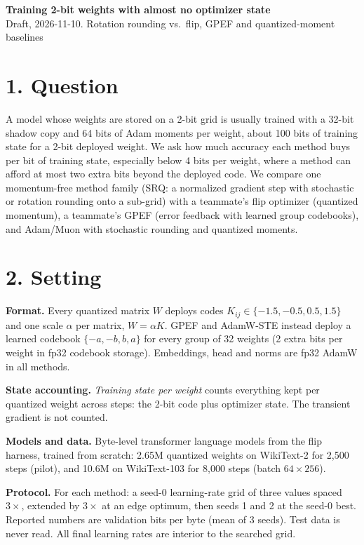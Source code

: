 \documentclass[11pt,letterpaper]{article}
\begin{document}
\begin{center}
{\Large\bfseries Training 2-bit weights with almost no optimizer state}\\[5pt]
{\small Draft, 2026-11-10. Rotation rounding vs.\ flip, GPEF and quantized-moment baselines}
\end{center}

\section*{1. Question}

A model whose weights are stored on a 2-bit grid is usually trained with a 32-bit shadow copy and 64 bits of
Adam moments per weight, about 100 bits of training state for a 2-bit deployed weight. We ask how much accuracy each
method buys per bit of training state, especially below 4 bits per weight, where a method can afford at most two
extra bits beyond the deployed code. We compare one momentum-free method family (SRQ: a normalized gradient step
with stochastic or rotation rounding onto a sub-grid) with a teammate's flip optimizer (quantized momentum), a
teammate's GPEF (error feedback with learned group codebooks), and Adam/Muon with stochastic rounding and quantized
moments.

\section*{2. Setting}

\textbf{Format.} Every quantized matrix $W$ deploys codes $K_{ij}\in\{-1.5,-0.5,0.5,1.5\}$ and one scale
$\alpha$ per matrix, $W=\alpha K$. GPEF and AdamW-STE instead deploy a learned codebook $\{-a,-b,b,a\}$ for every
group of 32 weights (2 extra bits per weight in fp32 codebook storage). Embeddings, head and norms are fp32 AdamW in
all methods.

\textbf{State accounting.} \emph{Training state per weight} counts everything kept per quantized weight across
steps: the 2-bit code plus optimizer state. The transient gradient is not counted.

\textbf{Models and data.} Byte-level transformer language models from the flip harness, trained from scratch:
2.65M quantized weights on WikiText-2 for 2{,}500 steps (pilot), and 10.6M on WikiText-103 for 8{,}000 steps
(batch $64\times256$).

\textbf{Protocol.} For each method: a seed-0 learning-rate grid of three values spaced $3\times$, extended by
$3\times$ at an edge optimum, then seeds 1 and 2 at the seed-0 best. Reported numbers are validation bits per byte
(mean of 3 seeds). Test data is never read. All final learning rates are interior to the searched grid.
\end{document}
